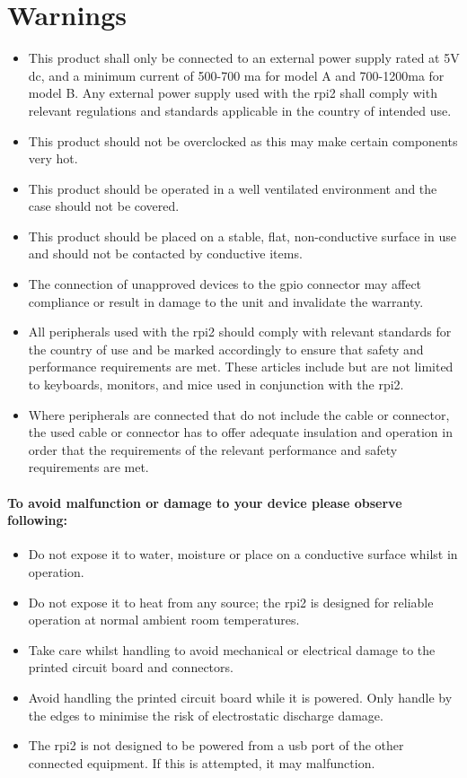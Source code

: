 \section{Warnings}
\begin{itemize}
\item This product shall only be connected to an external power supply rated at 5V dc, and a minimum current of 500-700 \gls{ma} for model A and 700-1200\gls{ma} for model B. Any external power supply used with the \gls{rpi2} shall comply with relevant regulations and standards applicable in the country of intended use. 
\item This product should not be overclocked as this may make certain components very hot. 
\item This product should be operated in a well ventilated environment and the case should not be covered. 
\item This product should be placed on a stable, flat, non-conductive surface in use and should not be contacted by conductive items. 
\item The connection of unapproved devices to the \gls{gpio} connector may affect compliance or result in damage to the unit and invalidate the warranty. 
\item All peripherals used with the \gls{rpi2} should comply with relevant standards for the country of use and be marked accordingly to ensure that safety and performance requirements are met. These articles include but are not limited to keyboards, monitors, and mice used in conjunction with the \gls{rpi2}.
\item Where peripherals are connected that do not include the cable or connector, the used cable or connector has to offer adequate insulation and operation in order that the requirements of the relevant performance and safety requirements are met.
\end{itemize}
\newpage
\paragraph{To avoid malfunction or damage to your device please observe following:}
\begin{itemize}
\item Do not expose it to water, moisture or place on a conductive surface whilst in operation.
\item Do not expose it to heat from any source; the \gls{rpi2} is designed for reliable operation at normal ambient room temperatures.
\item Take care whilst handling to avoid mechanical or electrical damage to the printed circuit board and connectors.
\item Avoid handling the printed circuit board while it is powered. Only handle by the edges to minimise the risk of electrostatic discharge damage.
\item The \gls{rpi2} is not designed to be powered from a \gls{usb} port of the other connected equipment. If this is attempted, it may malfunction.
\end{itemize}
\clearpageauthor


